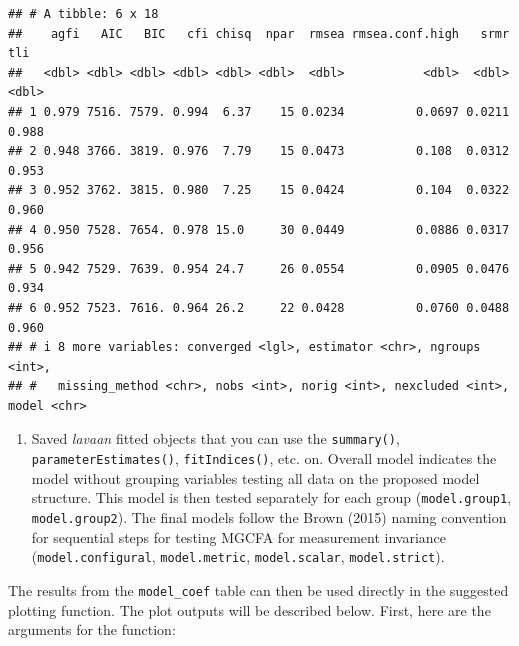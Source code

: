 \documentclass[
  man]{apa7}
\newenvironment{Shaded}{\begin{snugshade}}{\end{snugshade}}
\newcommand{\FunctionTok}[1]{\textcolor[rgb]{0.00,0.00,0.00}{#1}}
\newcommand{\NormalTok}[1]{#1}
\newcommand{\SpecialCharTok}[1]{\textcolor[rgb]{0.00,0.00,0.00}{#1}}
\providecommand{\tightlist}{%
  \setlength{\itemsep}{0pt}\setlength{\parskip}{0pt}}
\begin{document}
\small

\begin{Shaded}
\end{Shaded}

\normalsize

\begin{verbatim}
## # A tibble: 6 x 18
##    agfi   AIC   BIC   cfi chisq  npar  rmsea rmsea.conf.high   srmr   tli
##   <dbl> <dbl> <dbl> <dbl> <dbl> <dbl>  <dbl>           <dbl>  <dbl> <dbl>
## 1 0.979 7516. 7579. 0.994  6.37    15 0.0234          0.0697 0.0211 0.988
## 2 0.948 3766. 3819. 0.976  7.79    15 0.0473          0.108  0.0312 0.953
## 3 0.952 3762. 3815. 0.980  7.25    15 0.0424          0.104  0.0322 0.960
## 4 0.950 7528. 7654. 0.978 15.0     30 0.0449          0.0886 0.0317 0.956
## 5 0.942 7529. 7639. 0.954 24.7     26 0.0554          0.0905 0.0476 0.934
## 6 0.952 7523. 7616. 0.964 26.2     22 0.0428          0.0760 0.0488 0.960
## # i 8 more variables: converged <lgl>, estimator <chr>, ngroups <int>,
## #   missing_method <chr>, nobs <int>, norig <int>, nexcluded <int>, model <chr>
\end{verbatim}

\begin{enumerate}
\def\labelenumi{\arabic{enumi})}
\setcounter{enumi}{2}
\tightlist
\item
  Saved \emph{lavaan} fitted objects that you can use the \texttt{summary()}, \texttt{parameterEstimates()}, \texttt{fitIndices()}, etc. on. Overall model indicates the model without grouping variables testing all data on the proposed model structure. This model is then tested separately for each group (\texttt{model.group1}, \texttt{model.group2}). The final models follow the Brown (2015) naming convention for sequential steps for testing MGCFA for measurement invariance (\texttt{model.configural}, \texttt{model.metric}, \texttt{model.scalar}, \texttt{model.strict}).
\end{enumerate}

The results from the \texttt{model\_coef} table can then be used directly in the suggested plotting function. The plot outputs will be described below. First, here are the arguments for the function:
\end{document}
